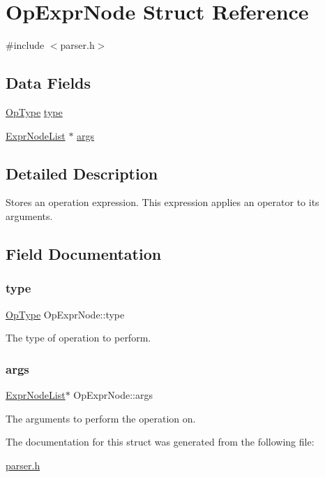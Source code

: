 \hypertarget{struct_op_expr_node}{}\section{Op\+Expr\+Node Struct Reference}
\label{struct_op_expr_node}


{\ttfamily \#include $<$parser.\+h$>$}

\subsection*{Data Fields}
\begin{DoxyCompactItemize}
\item 
\hyperlink{parser_8h_aa1aa1c6a8f3bbed5b167bc2d4511b969}{Op\+Type} \hyperlink{struct_op_expr_node_a69ff4baea505db8ed32f4c4027f24ac6}{type}
\item 
\hyperlink{struct_expr_node_list}{Expr\+Node\+List} $\ast$ \hyperlink{struct_op_expr_node_a82d6f2c460a585ee3b0a46ce00ba186f}{args}
\end{DoxyCompactItemize}


\subsection{Detailed Description}
Stores an operation expression. This expression applies an operator to its arguments. 

\subsection{Field Documentation}
\mbox{\label{struct_op_expr_node_a69ff4baea505db8ed32f4c4027f24ac6}} 
\subsubsection{\texorpdfstring{type}{type}}
{\footnotesize\ttfamily \hyperlink{parser_8h_aa1aa1c6a8f3bbed5b167bc2d4511b969}{Op\+Type} Op\+Expr\+Node\+::type}

The type of operation to perform. \mbox{\label{struct_op_expr_node_a82d6f2c460a585ee3b0a46ce00ba186f}} 
\subsubsection{\texorpdfstring{args}{args}}
{\footnotesize\ttfamily \hyperlink{struct_expr_node_list}{Expr\+Node\+List}$\ast$ Op\+Expr\+Node\+::args}

The arguments to perform the operation on. 

The documentation for this struct was generated from the following file\+:\begin{DoxyCompactItemize}
\item 
\hyperlink{parser_8h}{parser.\+h}\end{DoxyCompactItemize}
